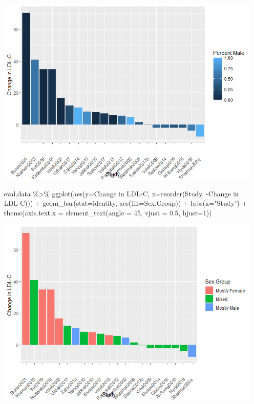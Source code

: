 \documentclass[
]{article}
\newenvironment{Shaded}{\begin{snugshade}}{\end{snugshade}}
\newcommand{\AttributeTok}[1]{\textcolor[rgb]{0.77,0.63,0.00}{#1}}
\newcommand{\DecValTok}[1]{\textcolor[rgb]{0.00,0.00,0.81}{#1}}
\newcommand{\FloatTok}[1]{\textcolor[rgb]{0.00,0.00,0.81}{#1}}
\newcommand{\FunctionTok}[1]{\textcolor[rgb]{0.00,0.00,0.00}{#1}}
\newcommand{\NormalTok}[1]{#1}
\newcommand{\SpecialCharTok}[1]{\textcolor[rgb]{0.00,0.00,0.00}{#1}}
\newcommand{\StringTok}[1]{\textcolor[rgb]{0.31,0.60,0.02}{#1}}
\begin{document}
\includegraphics{figures/ldl-change-2.png}

\begin{Shaded}
\begin{Highlighting}[]
\NormalTok{eval.data }\SpecialCharTok{\%\textgreater{}\%}
  \FunctionTok{ggplot}\NormalTok{(}\FunctionTok{aes}\NormalTok{(}\AttributeTok{y=}\StringTok{\textasciigrave{}}\AttributeTok{Change in LDL{-}C}\StringTok{\textasciigrave{}}\NormalTok{,}
             \AttributeTok{x=}\FunctionTok{reorder}\NormalTok{(Study, }\SpecialCharTok{{-}}\StringTok{\textasciigrave{}}\AttributeTok{Change in LDL{-}C}\StringTok{\textasciigrave{}}\NormalTok{))) }\SpecialCharTok{+}
  \FunctionTok{geom\_bar}\NormalTok{(}\AttributeTok{stat=}\StringTok{\textquotesingle{}identity\textquotesingle{}}\NormalTok{, }\FunctionTok{aes}\NormalTok{(}\AttributeTok{fill=}\StringTok{\textasciigrave{}}\AttributeTok{Sex.Group}\StringTok{\textasciigrave{}}\NormalTok{)) }\SpecialCharTok{+}
  \FunctionTok{labs}\NormalTok{(}\AttributeTok{x=}\StringTok{"Study"}\NormalTok{) }\SpecialCharTok{+}
    \FunctionTok{theme}\NormalTok{(}\AttributeTok{axis.text.x =} \FunctionTok{element\_text}\NormalTok{(}\AttributeTok{angle =} \DecValTok{45}\NormalTok{, }\AttributeTok{vjust =} \FloatTok{0.5}\NormalTok{, }\AttributeTok{hjust=}\DecValTok{1}\NormalTok{))}
\end{Highlighting}
\end{Shaded}

\includegraphics{figures/ldl-change-3.png}
\end{document}
